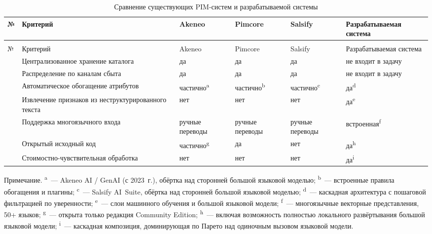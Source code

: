 {\small\setlength{\tabcolsep}{4pt}
\begin{xltabular}{\textwidth}{|>{\centering\arraybackslash}p{0.5cm}|>{\raggedright\arraybackslash}X|>{\centering\arraybackslash}p{2.0cm}|>{\centering\arraybackslash}p{2.0cm}|>{\centering\arraybackslash}p{2.0cm}|>{\raggedright\arraybackslash}p{3.4cm}|}
\caption{Сравнение существующих PIM-систем и разрабатываемой системы}\label{tab:pim_compare} \\ \hline
    № & Критерий & Akeneo & Pimcore & Salsify & Разраба\-тываемая система \\ \hline
\endfirsthead
{} \\ \hline
    № & Критерий & Akeneo & Pimcore & Salsify & Разраба\-тываемая система \\ \hline
{} & Централизованное хранение каталога & да & да & да & не входит в задачу \\  & Распределение по каналам сбыта & да & да & да & не входит в задачу \\  & Автоматическое обогащение атрибутов & частично\textsuperscript{a} & частично\textsuperscript{b} & частично\textsuperscript{c} & да\textsuperscript{d} \\  & Извлечение признаков из неструктури\-рованного текста & нет & нет & нет & да\textsuperscript{e} \\  & Поддержка многоязычного входа & ручные переводы & ручные переводы & ручные переводы & встроенная\textsuperscript{f} \\  & Открытый исходный код & частично\textsuperscript{g} & да & нет & да\textsuperscript{h} \\  & Стоимостно-чувствительная обработка & нет & нет & нет & да\textsuperscript{i} \\ \hline
\end{xltabular}
}

\noindent\footnotesize Примечание. \textsuperscript{a}~--- Akeneo AI / GenAI (с 2023~г.), обёртка над сторонней большой языковой моделью; \textsuperscript{b}~--- встроенные правила обогащения и плагины; \textsuperscript{c}~--- Salsify AI~Suite, обёртка над сторонней большой языковой моделью; \textsuperscript{d}~--- каскадная архитектура с пошаговой фильтрацией по уверенности; \textsuperscript{e}~--- слои машинного обучения и большой языковой модели; \textsuperscript{f}~--- многоязычные векторные представления, 50+ языков; \textsuperscript{g}~--- открыта только редакция Community Edition; \textsuperscript{h}~--- включая возможность полностью локального развёртывания большой языковой модели; \textsuperscript{i}~--- каскадная композиция, доминирующая по Парето над одиночным вызовом языковой модели.\normalsize


